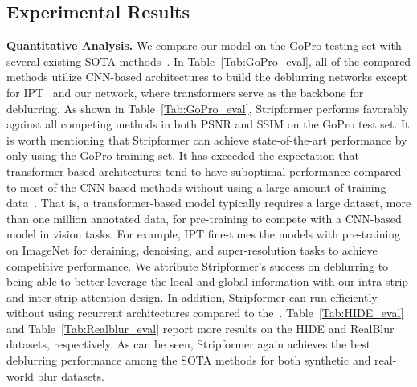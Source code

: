 \subsection{Experimental Results}
\noindent\textbf{Quantitative Analysis.}
We compare our model on the GoPro testing set with several existing SOTA methods~\cite{IPT,Chi_2021_CVPR,MIMO,gao2019dynamic,Hu_2021_ICCV,Kupyn_2019_ICCV,Li_2021_ICCV,MT_2020_ECCV,RADN_2020_ECCV,Purohit_2021_ICCV,SAPN2020,tao2018srndeblur,Yuan_2020_CVPR,Zamir2021MPRNet,Zhang_2019_CVPR,Zhang_2020_CVPR}.
In Table~\ref{Tab:GoPro_eval}, all of the compared methods utilize CNN-based architectures to build the deblurring networks except for IPT~\cite{IPT} and our network, where transformers serve as the backbone for deblurring.
As shown in Table~\ref{Tab:GoPro_eval}, Stripformer performs favorably against all competing methods in both PSNR and SSIM on the GoPro test set.
It is worth mentioning that Stripformer can achieve state-of-the-art performance by only using the GoPro training set. It has exceeded the expectation that transformer-based architectures tend to have suboptimal performance compared to most of the CNN-based methods without using a large amount of training data~\cite{IPT,dosovitskiy2020vit}.
That is, a transformer-based model typically requires a large dataset, \eg more than one million annotated data, for pre-training to compete with a CNN-based model in vision tasks.
For example, IPT fine-tunes the models with pre-training on ImageNet for deraining, denoising, and super-resolution tasks to achieve competitive performance.
We attribute Stripformer's success on deblurring to being able to better leverage the local and global information with our intra-strip and inter-strip attention design.
In addition, Stripformer can run efficiently without using recurrent architectures compared to the~\cite{SAPN2020,Zamir2021MPRNet,Zhang_2019_CVPR}.
Table~\ref{Tab:HIDE_eval} and Table~\ref{Tab:Realblur_eval} report more results on the HIDE and RealBlur datasets, respectively. As can be seen, Stripformer again achieves the best deblurring performance among the SOTA methods for both synthetic and real-world blur datasets.

